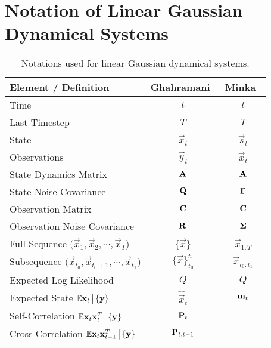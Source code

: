 \section{Notation of Linear Gaussian Dynamical Systems}



\begin{table}[ht]
	\centering
	\begin{tabular}{l|cc}
		\textbf{Element / Definition} & \textbf{Ghahramani}~\cite{ghahramaniParameterEstimationLinear1996} & \textbf{Minka}~\cite{minkaHiddenMarkovModels1999} \\ \hline
		Time                         & \( t \)                         & \( t \)                 \\
		Last Timestep                & \( T \)                         & \( T \)                 \\
		State                        & \( \vec{x}_t \)                 & \( \vec{s}_t \)         \\
		Observations                 & \( \vec{y}_t \)                 & \( \vec{x}_t \)         \\
		State Dynamics Matrix        & \( \boldsymbol{\mathrm{A}} \)                   & \( \boldsymbol{\mathrm{A}} \)           \\
		State Noise Covariance       & \( \boldsymbol{\mathrm{Q}} \)                   & \( \boldsymbol{\mathrm{\Gamma}} \)      \\
		Observation Matrix           & \( \boldsymbol{\mathrm{C}} \)                   & \( \boldsymbol{\mathrm{C}} \)           \\
		Observation Noise Covariance & \( \boldsymbol{\mathrm{R}} \)                   & \( \boldsymbol{\mathrm{\Sigma}} \)      \\
		Full Sequence \( \big( \vec{x}_1, \vec{x}_2, \cdots, \vec{x}_T \big) \)
		                             & \( \{ \vec{x} \} \)             & \( \vec{x}_{1:T} \)     \\
		Subsequence \( \big( \vec{x}_{t_0}, \vec{x}_{t_0 + 1}, \cdots, \vec{x}_{t_1} \big) \)
		                             & \( \{ \vec{x} \}_{t_0}^{t_1} \) & \( \vec{x}_{t_0:t_1} \) \\
		Expected Log Likelihood      & \( Q \)                         & \( Q \)                 \\
		Expected State \( \mathbb{E}{\boldsymbol{\mathrm{x}}_t \,\big\vert\, \{ \boldsymbol{\mathrm{y}} \}} \)
		                             & \( \hat{\vec{x}}_t \)           & \( \boldsymbol{\mathrm{\boldsymbol{\mathrm{m}}}}_t \)   \\
		Self-Correlation \( \mathbb{E}{\boldsymbol{\mathrm{x}}_t \boldsymbol{\mathrm{x}}_t^T \,\big\vert\, \{ \boldsymbol{\mathrm{y}} \}} \)
		                             & \( \boldsymbol{\mathrm{P}}_t \)                 & -                       \\
		Cross-Correlation \( \mathbb{E}{\boldsymbol{\mathrm{x}}_t \boldsymbol{\mathrm{x}}_{t-1}^T \,\big\vert\, \{ \boldsymbol{\mathrm{y}} \}} \)
		                             & \( \boldsymbol{\mathrm{P}}_{t, t - 1} \)        & -
	\end{tabular}
	\caption{Notations used for linear Gaussian dynamical systems.}
\end{table}
